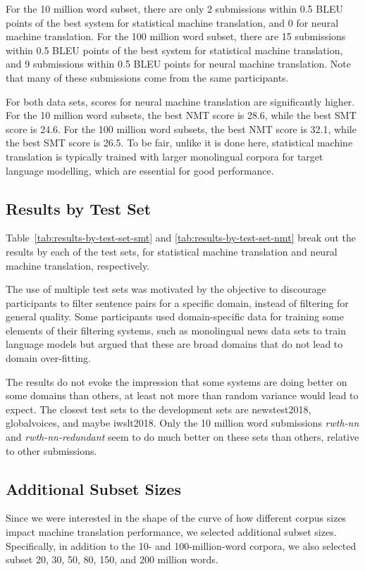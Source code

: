 \documentclass[11pt,a4paper]{article}
\begin{document}
For the 10 million word subset, there are only 2 submissions within 0.5 BLEU points of the best system for statistical machine translation, and 0 for neural machine translation. For the 100 million word subset, there are 15 submissions within 0.5 BLEU points of the best system for statistical machine translation, and 9 submissions within 0.5 BLEU points for neural machine translation. Note that many of these submissions come from the same participants.

For both data sets, scores for neural machine translation are significantly higher. For the 10 million word subsets, the best NMT score is 28.6, while the best SMT score is 24.6. For the 100 million word subsets, the best NMT score is 32.1, while the best SMT score is 26.5. To be fair, unlike it is done here, statistical machine translation is typically trained with larger monolingual corpora for target language modelling, which are essential for good performance.

\subsection{Results by Test Set}

Table~\ref{tab:results-by-test-set-smt} and \ref{tab:results-by-test-set-nmt} break out the results by each of the test sets, for statistical machine translation and neural machine translation, respectively.

The use of multiple test sets was motivated by the objective to discourage participants to filter sentence pairs for a specific domain, instead of filtering for general quality. Some participants used domain-specific data for training some elements of their filtering systems, such as monolingual news data sets to train language models but argued that these are broad domains that do not lead to domain over-fitting.

The results do not evoke the impression that some systems are doing better on some domains than others, at least not more than random variance would lead to expect. 
%
The closest test sets to the development sets are {\sc newstest2018}, {\sc globalvoices}, and maybe {\sc iwslt2018}. Only the 10 million word submissions {\em rwth-nn} and {\em rwth-nn-redundant} seem to do much better on these sets than others, relative to other submissions.

\subsection{Additional Subset Sizes}
Since we were interested in the shape of the curve of how different corpus sizes impact machine translation performance, we selected additional subset sizes. Specifically, in addition to the 10- and 100-million-word corpora, we also selected subset 20, 30, 50, 80, 150, and 200 million words.
\end{document}
